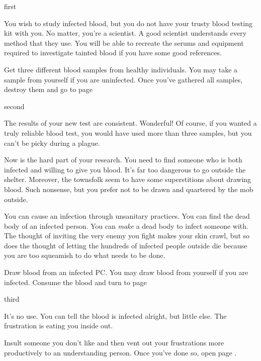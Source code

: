 \documentclass[greennotebook]{guildcamp4} %
\begin{document}
\startnotebook{\nOutsiderLab{}}

\begin{page}{first}

You wish to study infected blood, but you do not have your trusty blood testing kit with you. No matter, you're a scientist. A good scientist understands every method that they use. You will be able to recreate the serums and equipment required to investigate tainted blood if you have some good references.

Get three different blood samples from healthy individuals. You may take a sample from yourself if you are uninfected. Once you've gathered all samples, destroy them and go to page 

\end{page}

\begin{page}{second}

The results of your new test are consistent. Wonderful! Of course, if you wanted a truly reliable blood test, you would have used more than three samples, but you can't be picky during a plague. 

Now is the hard part of your research. You need to find someone who is both infected and willing to give you blood. It's far too dangerous to go outside the shelter. Moreover, the townsfolk seem to have some superstitions about drawing blood. Such nonsense, but you prefer not to be drawn and quartered by the mob outside.

You can cause an infection through unsanitary practices. You can find the dead body of an infected person. You can \textit{make} a dead body to infect someone with. The thought of inviting the very enemy you fight makes your skin crawl, but so does the thought of letting the hundreds of infected people outside die because you are too squeamish to do what needs to be done.

Draw blood from an infected PC. You may draw blood from yourself if you are infected. Consume the blood and turn to page 

\end{page}

\begin{page}{third}

It's no use. You can tell the blood is infected alright, but little else. The frustration is eating you inside out.

Insult someone you don't like and then vent out your frustrations more productively to an understanding person. Once you've done so, open page .

\end{page}
\end{document}
